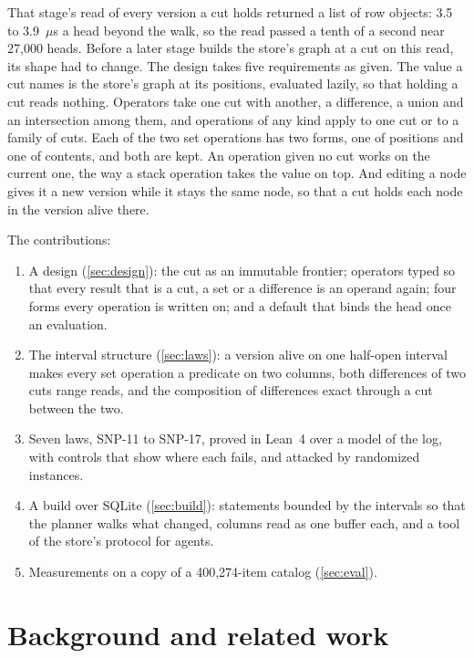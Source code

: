 \documentclass[11pt]{article}
\theoremstyle{plain}
\theoremstyle{definition}
\begin{document}
That stage's read of every version a cut holds returned a list of row objects: 3.5 to 3.9~$\mu$s a
head beyond the walk, so the read passed a tenth of a second near 27{,}000 heads. Before a later
stage builds the store's graph at a cut on this read, its shape had to change. The design takes
five requirements as given. The value a cut names is the store's graph at its positions, evaluated
lazily, so that holding a cut reads nothing. Operators take one cut with another, a difference, a
union and an intersection among them, and operations of any kind apply to one cut or to a family of
cuts. Each of the two set operations has two forms, one of positions and one of contents, and both
are kept. An operation given no cut works on the current one, the way a stack operation takes the
value on top. And editing a node gives it a new version while it stays the same node, so that a cut
holds each node in the version alive there.

The contributions:
\begin{enumerate}
\item A design (\cref{sec:design}): the cut as an immutable frontier; operators typed so that every
  result that is a cut, a set or a difference is an operand again; four forms every operation is
  written on; and a default that binds the head once an evaluation.
\item The interval structure (\cref{sec:laws}): a version alive on one half-open interval makes
  every set operation a predicate on two columns, both differences of two cuts range reads, and
  the composition of differences exact through a cut between the two.
\item Seven laws, SNP-11 to SNP-17, proved in Lean~4 over a model of the log, with controls that
  show where each fails, and attacked by randomized instances.
\item A build over SQLite (\cref{sec:build}): statements bounded by the intervals so that the
  planner walks what changed, columns read as one buffer each, and a tool of the store's protocol
  for agents.
\item Measurements on a copy of a 400{,}274-item catalog (\cref{sec:eval}).
\end{enumerate}

\section{Background and related work}
\end{document}
